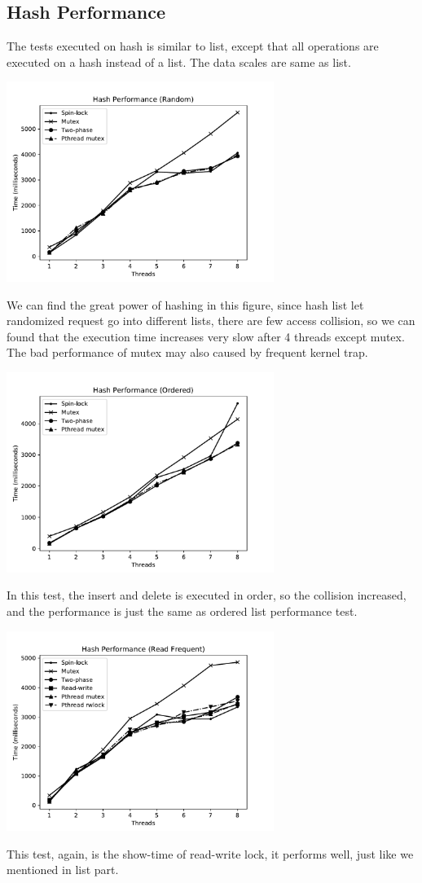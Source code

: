 \documentclass{article}
\begin{document}
\subsection{Hash Performance}
The tests executed on hash is similar to list, except that all operations are executed on a hash instead of a list. The data scales are same as list.
\begin{center}
\includegraphics[width=0.65\textwidth]{OSLAB4_HASH1.pdf}
\end{center}
We can find the great power of hashing in this figure, since hash list let randomized request go into different lists, there are few access collision, so we can found that the execution time increases very slow after 4 threads except mutex. The bad performance of mutex may also caused by frequent kernel trap.
\begin{center}
\includegraphics[width=0.65\textwidth]{OSLAB4_HASH2.pdf}
\end{center}
In this test, the insert and delete is executed in order, so the collision increased, and the performance is just the same as ordered list performance test.
\begin{center}
\includegraphics[width=0.65\textwidth]{OSLAB4_HASH3.pdf}
\end{center}
This test, again, is the show-time of read-write lock, it performs well, just like we mentioned in list part.
\end{document}
